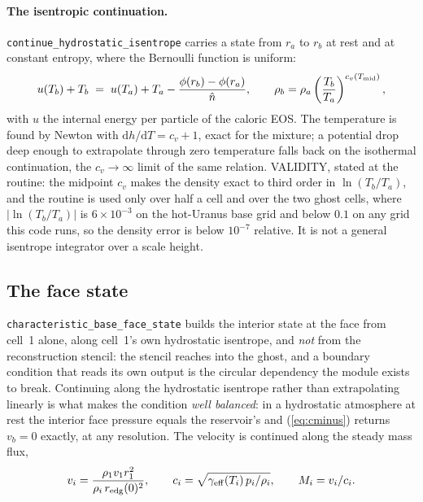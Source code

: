 \documentclass[english,a4paper]{my_memo}
\begin{document}
\paragraph{The isentropic continuation.}
\texttt{continue\_hydrostatic\_isentrope} carries a state from $r_a$ to
$r_b$ at rest and at constant entropy, where the Bernoulli function is
uniform:
\begin{equation}
u(T_b) + T_b \;=\; u(T_a) + T_a - \frac{\phi(r_b) - \phi(r_a)}{\hat n} ,
\qquad
\rho_b = \rho_a \left(\frac{T_b}{T_a}\right)^{c_v(T_{\rm mid})} ,
\end{equation}
with $u$ the internal energy per particle of the caloric EOS. The
temperature is found by Newton with $\mathrm{d}h/\mathrm{d}T = c_v + 1$,
exact for the mixture; a potential drop deep enough to extrapolate through
zero temperature falls back on the isothermal continuation, the
$c_v \to \infty$ limit of the same relation. VALIDITY, stated at the
routine: the midpoint $c_v$ makes the density exact to third order in
$\ln(T_b/T_a)$, and the routine is used only over half a cell and over the
two ghost cells, where $|\ln(T_b/T_a)|$ is $6\times10^{-3}$ on the
hot-Uranus base grid and below $0.1$ on any grid this code runs, so the
density error is below $10^{-7}$ relative. It is not a general isentrope
integrator over a scale height.

\subsection{The face state}
\label{sec:facestate}

\texttt{characteristic\_base\_face\_state} builds the interior state at the
face from cell~1 alone, along cell~1's own hydrostatic isentrope, and
\emph{not} from the reconstruction stencil: the stencil reaches into the
ghost, and a boundary condition that reads its own output is the circular
dependency the module exists to break. Continuing along the hydrostatic
isentrope rather than extrapolating linearly is what makes the condition
\emph{well balanced}: in a hydrostatic atmosphere at rest the interior face
pressure equals the reservoir's and (\ref{eq:cminus}) returns $v_b = 0$
exactly, at any resolution. The velocity is continued along the steady
mass flux,
\begin{equation}
v_i = \frac{\rho_1 v_1 r_1^2}{\rho_i\, r_{\rm edg}(0)^2} ,
\qquad
c_i = \sqrt{\gamma_{\rm eff}(T_i)\, p_i/\rho_i}, \qquad M_i = v_i/c_i .
\end{equation}
\end{document}
